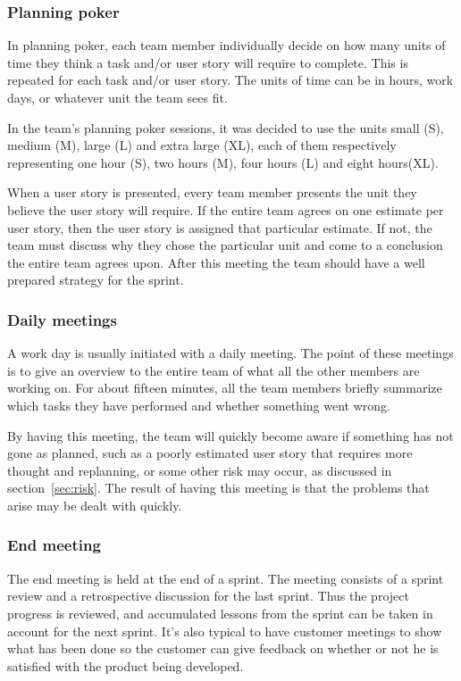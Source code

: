 \subsubsection{Planning poker}
In planning poker, each team member individually decide on how many units of time they think a task and/or user story will require to complete. This is repeated for each task and/or user story. The units of time can be in hours, work days, or whatever unit the team sees fit.

In the team's planning poker sessions, it was decided to use the units small (S), medium (M), large (L) and extra large (XL), each of them respectively representing one hour (S), two hours (M), four hours (L) and eight hours(XL).

When a user story is presented, every team member presents the unit they believe the user story will require. If the entire team agrees on one estimate per user story, then the user story is assigned that particular estimate. If not, the team must discuss why they chose the particular unit and come to a conclusion the entire team agrees upon.
After this meeting the team should have a well prepared strategy for the sprint.


\subsubsection{Daily meetings}
A work day is usually initiated with a daily meeting. The point of these meetings is to give an overview to the entire team of what all the other members are working on. For about fifteen minutes, all the team members briefly summarize which tasks they have performed and whether something went wrong.

By having this meeting, the team will quickly become aware if something has not gone as planned, such as a poorly estimated user story that requires more thought and replanning, or some other risk may occur, as discussed in section~\ref{sec:risk}. The result of having this meeting is that the problems that arise may be dealt with quickly.

\subsubsection{End meeting}
The end meeting is held at the end of a sprint. The meeting consists of a sprint review and a retrospective discussion for the last sprint.
Thus the project progress is reviewed, and accumulated lessons from the sprint can be taken in account for the next sprint.
It's also typical to have customer meetings to show what has been done so the customer can give feedback on 
whether or not he is satisfied with the product being developed.

